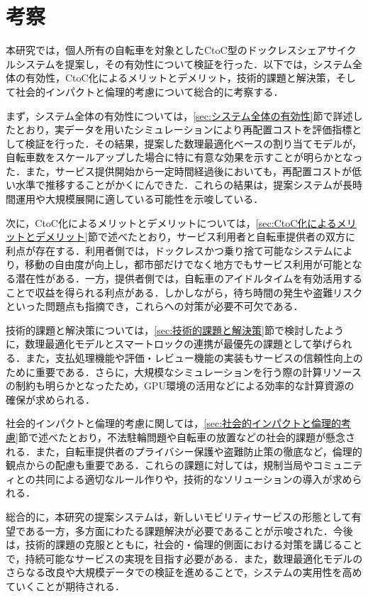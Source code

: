 \clearpage
\newpage

\section{考察}
  \label{sec:考察}
    \par 本研究では，個人所有の自転車を対象としたCtoC型のドックレスシェアサイクルシステムを提案し，その有効性について検証を行った．以下では，システム全体の有効性，CtoC化によるメリットとデメリット，技術的課題と解決策，そして社会的インパクトと倫理的考慮について総合的に考察する．
    \par まず，システム全体の有効性については，\ref{sec:システム全体の有効性}節で詳述したとおり，実データを用いたシミュレーションにより再配置コストを評価指標として検証を行った．その結果，提案した数理最適化ベースの割り当てモデルが，自転車数をスケールアップした場合に特に有意な効果を示すことが明らかとなった．また，サービス提供開始から一定時間経過後においても，再配置コストが低い水準で推移することがかくにんできた．これらの結果は，提案システムが長時間運用や大規模展開に適している可能性を示唆している．
    \par 次に，CtoC化によるメリットとデメリットについては，\ref{sec:CtoC化によるメリットとデメリット}節で述べたとおり，サービス利用者と自転車提供者の双方に利点が存在する．利用者側では，ドックレスかつ乗り捨て可能なシステムにより，移動の自由度が向上し，都市部だけでなく地方でもサービス利用が可能となる潜在性がある．一方，提供者側では，自転車のアイドルタイムを有効活用することで収益を得られる利点がある．しかしながら，待ち時間の発生や盗難リスクといった問題点も指摘でき，これらへの対策が必要不可欠である．
    \par 技術的課題と解決策については，\ref{sec:技術的課題と解決策}節で検討したように，数理最適化モデルとスマートロックの連携が最優先の課題として挙げられる．また，支払処理機能や評価・レビュー機能の実装もサービスの信頼性向上のために重要である．さらに，大規模なシミュレーションを行う際の計算リソースの制約も明らかとなったため，GPU環境の活用などによる効率的な計算資源の確保が求められる．
    \par 社会的インパクトと倫理的考慮に関しては，\ref{sec:社会的インパクトと倫理的考慮}節で述べたとおり，不法駐輪問題や自転車の放置などの社会的課題が懸念される．また，自転車提供者のプライバシー保護や盗難防止策の徹底など，倫理的観点からの配慮も重要である．これらの課題に対しては，規制当局やコミュニティとの共同による適切なルール作りや，技術的なソリューションの導入が求められる．
    \par 総合的に，本研究の提案システムは，新しいモビリティサービスの形態として有望である一方，多方面にわたる課題解決が必要であることが示唆された．今後は，技術的課題の克服とともに，社会的・倫理的側面における対策を講じることで，持続可能なサービスの実現を目指す必要がある．また，数理最適化モデルのさらなる改良や大規模データでの検証を進めることで，システムの実用性を高めていくことが期待される．
  
